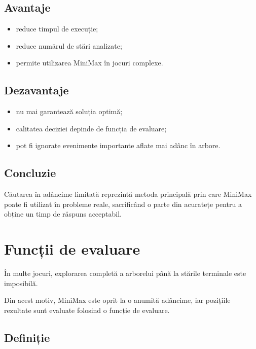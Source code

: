 \documentclass[12pt,a4paper]{article}
\begin{document}
\subsection{Avantaje}

\begin{itemize}
\item reduce timpul de execuție;
\item reduce numărul de stări analizate;
\item permite utilizarea MiniMax în jocuri complexe.
\end{itemize}

\subsection{Dezavantaje}

\begin{itemize}
\item nu mai garantează soluția optimă;
\item calitatea deciziei depinde de funcția de evaluare;
\item pot fi ignorate evenimente importante aflate mai adânc în arbore.
\end{itemize}

\subsection{Concluzie}

Căutarea în adâncime limitată reprezintă metoda principală prin care MiniMax poate fi utilizat în probleme reale, sacrificând o parte din acuratețe pentru a obține un timp de răspuns acceptabil.









\section{Funcții de evaluare}

În multe jocuri, explorarea completă a arborelui până la stările terminale este imposibilă.

Din acest motiv, MiniMax este oprit la o anumită adâncime, iar pozițiile rezultate sunt evaluate folosind o funcție de evaluare.

\subsection{Definiție}
\end{document}
